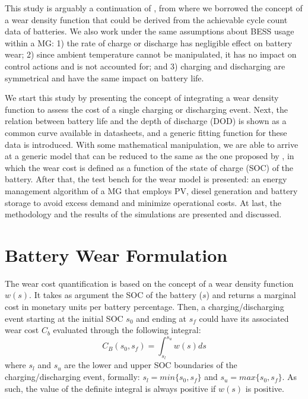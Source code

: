 \documentclass{ieeeaccess}
\begin{document}
    This study is arguably a continuation of \cite{HAN2014}, from where we borrowed the concept of a wear density function that could be derived from the achievable cycle count data of batteries. We also work under the same assumptions about BESS usage within a MG: 1) the rate of charge or discharge has negligible effect on battery wear; 2) since ambient temperature cannot be manipulated, it has no impact on control actions and is not accounted for; and 3) charging and discharging are symmetrical and have the same impact on battery life.

    We start this study by presenting the concept of integrating a wear density function to assess the cost of a single charging or discharging event. Next, the relation between battery life and the depth of discharge (DOD) is shown as a common curve available in datasheets, and a generic fitting function for these data is introduced. With some mathematical manipulation, we are able to arrive at a generic model that can be reduced to the same as the one proposed by \cite{HAN2014}, in which the wear cost is defined as a function of the state of charge (SOC) of the battery. After that, the test bench for the wear model is presented: an energy management algorithm of a MG that employs PV, diesel generation and battery storage to avoid excess demand and minimize operational costs. At last, the methodology and the results of the simulations are presented and discussed.


    \section{Battery Wear Formulation}

    The wear cost quantification is based on the concept of a wear density function $w(s)$. It takes as argument the SOC of the battery ($s$) and returns a marginal cost in monetary units per battery percentage. Then, a charging/discharging event starting at the initial SOC $s_{0}$ and ending at $s_{f}$ could have its associated wear cost $C_{b}$ evaluated through the following integral:
    \begin{equation}
        C_{B}(s_{0}, s_{f}) = \int_{s_{l}}^{s_{u}}w(s)ds
        \label{eq:Cb(s0,sf)}
    \end{equation}
    where $s_{l}$ and $s_{u}$ are the lower and upper SOC boundaries of the charging/discharging event, formally: $s_{l} = min\{s_{0}, s_{f}\}$ and $s_{u} = max\{s_{0}, s_{f}\}$. As such, the value of the definite integral is always positive if $w(s)$ is positive.
\end{document}
